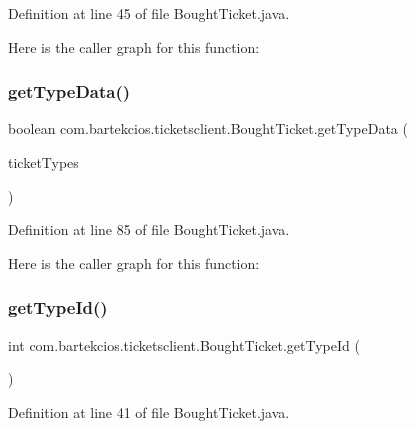 Definition at line 45 of file Bought\+Ticket.\+java.

Here is the caller graph for this function\+:
\mbox{\label{classcom_1_1bartekcios_1_1ticketsclient_1_1_bought_ticket_a906e441fb4b6aa098af29012c9a5f973}} 
\subsubsection{\texorpdfstring{get\+Type\+Data()}{getTypeData()}}
{\footnotesize\ttfamily boolean com.\+bartekcios.\+ticketsclient.\+Bought\+Ticket.\+get\+Type\+Data (\begin{DoxyParamCaption}\item[{List$<$ \hyperlink{classcom_1_1bartekcios_1_1ticketsclient_1_1_ticket_type}{Ticket\+Type} $>$}]{ticket\+Types }\end{DoxyParamCaption})}



Definition at line 85 of file Bought\+Ticket.\+java.

Here is the caller graph for this function\+:
\mbox{\label{classcom_1_1bartekcios_1_1ticketsclient_1_1_bought_ticket_af9b4cc0e90fc5d63c3d956bad17d1dcb}} 
\subsubsection{\texorpdfstring{get\+Type\+Id()}{getTypeId()}}
{\footnotesize\ttfamily int com.\+bartekcios.\+ticketsclient.\+Bought\+Ticket.\+get\+Type\+Id (\begin{DoxyParamCaption}{ }\end{DoxyParamCaption})}



Definition at line 41 of file Bought\+Ticket.\+java.

